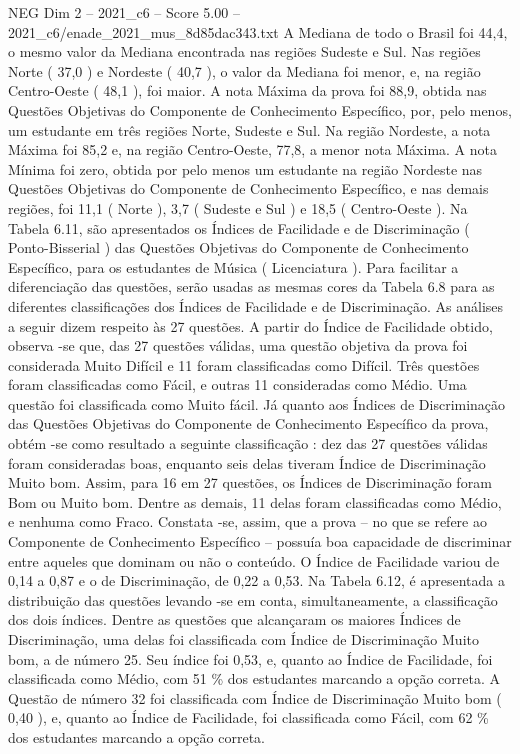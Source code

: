 \begin{textsample}{NEG Dim 2 – 2021\_c6 – Score 5.00 – 2021\_c6/enade\_2021\_mus\_8d85dac343.txt}
A Mediana de todo o Brasil foi 44,4, o mesmo valor da Mediana encontrada nas regiões Sudeste e Sul.
Nas regiões Norte ( 37,0 ) e Nordeste ( 40,7 ), o valor da Mediana foi menor, e, na região Centro-Oeste ( 48,1 ), foi maior.
A nota Máxima da prova foi 88,9, obtida nas Questões Objetivas do Componente de Conhecimento Específico, por, pelo menos, um estudante em três regiões Norte, Sudeste e Sul.
Na região Nordeste, a nota Máxima foi 85,2 e, na região Centro-Oeste, 77,8, a menor nota Máxima.
A nota Mínima foi zero, obtida por pelo menos um estudante na região Nordeste nas Questões Objetivas do Componente de Conhecimento Específico, e nas demais regiões, foi 11,1 ( Norte ), 3,7 ( Sudeste e Sul ) e 18,5 ( Centro-Oeste ).
Na Tabela 6.11, são apresentados os Índices de Facilidade e de Discriminação ( Ponto-Bisserial ) das Questões Objetivas do Componente de Conhecimento Específico, para os estudantes de Música ( Licenciatura ).
Para facilitar a diferenciação das questões, serão usadas as mesmas cores da Tabela 6.8 para as diferentes classificações dos Índices de Facilidade e de Discriminação.
As análises a seguir dizem respeito às 27 questões.
A partir do Índice de Facilidade obtido, observa -se que, das 27 questões válidas, uma questão objetiva da prova foi considerada Muito Difícil e 11 foram classificadas como Difícil.
Três questões foram classificadas como Fácil, e outras 11 consideradas como Médio.
Uma questão foi classificada como Muito fácil.
Já quanto aos Índices de Discriminação das Questões Objetivas do Componente de Conhecimento Específico da prova, obtém -se como resultado a seguinte classificação : dez das 27 questões válidas foram consideradas boas, enquanto seis delas tiveram Índice de Discriminação Muito bom.
Assim, para 16 em 27 questões, os Índices de Discriminação foram Bom ou Muito bom.
Dentre as demais, 11 delas foram classificadas como Médio, e nenhuma como Fraco.
Constata -se, assim, que a prova – no que se refere ao Componente de Conhecimento Específico – possuía boa capacidade de discriminar entre aqueles que dominam ou não o conteúdo.
O Índice de Facilidade variou de 0,14 a 0,87 e o de Discriminação, de 0,22 a 0,53.
Na Tabela 6.12, é apresentada a distribuição das questões levando -se em conta, simultaneamente, a classificação dos dois índices.
Dentre as questões que alcançaram os maiores Índices de Discriminação, uma delas foi classificada com Índice de Discriminação Muito bom, a de número 25.
Seu índice foi 0,53, e, quanto ao Índice de Facilidade, foi classificada como Médio, com 51 \% dos estudantes marcando a opção correta.
A Questão de número 32 foi classificada com Índice de Discriminação Muito bom ( 0,40 ), e, quanto ao Índice de Facilidade, foi classificada como Fácil, com 62 \% dos estudantes marcando a opção correta.

\end{textsample}
